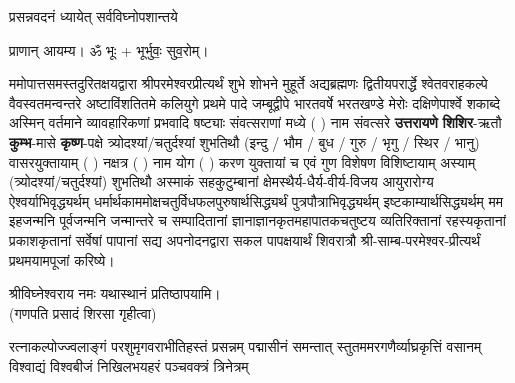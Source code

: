 

{प्रसन्नवदनं ध्यायेत् सर्वविघ्नोपशान्तये}
 
प्राणान्  आयम्य।  ॐ भूः + भूर्भुवः॒ सुव॒रोम्।

ममोपात्तसमस्तदुरितक्षयद्वारा श्रीपरमेश्वरप्रीत्यर्थं शुभे शोभने मुहूर्ते अद्यब्रह्मणः
द्वितीयपरार्द्धे श्वेतवराहकल्पे वैवस्वतमन्वन्तरे अष्टाविंशतितमे कलियुगे प्रथमे पादे
जम्बूद्वीपे भारतवर्षे भरतखण्डे मेरोः दक्षिणेपार्श्वे शकाब्दे अस्मिन् वर्तमाने व्यावहारिकणां
 प्रभवादि षष्ट्याः संवत्सराणां मध्ये (  ) नाम संवत्सरे \textbf{उत्तरायणे} 
\textbf{शिशिर}-ऋतौ  \textbf{कुम्भ}-मासे \textbf{कृष्ण}-पक्षे त्र्योदश्यां/चतुर्दश्यां शुभतिथौ
(इन्दु / भौम / बुध / गुरु / भृगु / स्थिर / भानु) वासरयुक्तायाम्
(  ) नक्षत्र (  ) नाम  योग  (  ) करण युक्तायां च एवं गुण विशेषण विशिष्टायाम्
अस्याम् (त्र्योदश्यां/चतुर्दश्यां) शुभतिथौ 
अस्माकं सहकुटुम्बानां क्षेमस्थैर्य-धैर्य-वीर्य-विजय आयुरारोग्य ऐश्वर्याभिवृद्ध्यर्थम्
 धर्मार्थकाममोक्ष\-चतुर्विधफलपुरुषार्थसिद्ध्यर्थं पुत्रपौत्राभि\-वृद्ध्यर्थम् इष्टकाम्यार्थसिद्ध्यर्थम्
मम इहजन्मनि पूर्वजन्मनि जन्मान्तरे च सम्पादितानां ज्ञानाज्ञानकृतमहा\-पातकचतुष्टय
व्यतिरिक्तानां रहस्यकृतानां प्रकाशकृतानां सर्वेषां पापानां सद्य अपनोदनद्वारा सकल 
पापक्षयार्थं शिवरात्रौ श्री-साम्ब-परमेश्वर-प्रीत्यर्थं प्रथमयामपूजां करिष्ये।



श्रीविघ्नेश्वराय नमः यथास्थानं प्रतिष्ठापयामि।\\
(गणपति प्रसादं शिरसा गृहीत्वा)
\renewcommand{\devaName}{विष्णु}














{रत्नाकल्पोज्ज्वलाङ्गं परशुमृगवराभीतिहस्तं प्रसन्नम्}
{पद्मासीनं समन्तात् स्तुतममरगणैर्व्याघ्रकृत्तिं वसानम्}
{विश्वाद्यं विश्वबीजं निखिलभयहरं पञ्चवक्त्रं त्रिनेत्रम्}

